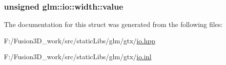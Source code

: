 \subsubsection[{value}]{\setlength{\rightskip}{0pt plus 5cm}unsigned glm\+::io\+::width\+::value}\label{structglm_1_1io_1_1width_a6bf1338eb947811d36ec93bd2e9b8425}


The documentation for this struct was generated from the following files\+:\begin{DoxyCompactItemize}
\item 
F\+:/\+Fusion3\+D\+\_\+work/src/static\+Libs/glm/gtx/\hyperlink{io_8hpp}{io.\+hpp}\item 
F\+:/\+Fusion3\+D\+\_\+work/src/static\+Libs/glm/gtx/\hyperlink{io_8inl}{io.\+inl}\end{DoxyCompactItemize}
